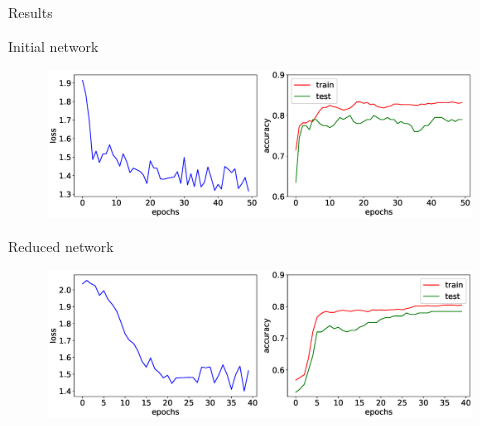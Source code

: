 \documentclass[9pt]{beamer}
\begin{document}
\begin{frame}{Results}
	\begin{block}{Initial network}
		\vspace{-0.2cm}
		\begin{figure}[h]
			\centering
			\includegraphics[width=0.9\linewidth]{figs/orig_net.eps}
		\end{figure}
	\end{block}
	\vspace{-0.7cm}
	\begin{block}{Reduced network}
		\vspace{-0.2cm}
		\begin{figure}
			\includegraphics[width=0.9\linewidth]{figs/reduced_net.eps}
		\end{figure}
	\end{block}
\end{frame}
\end{document}
